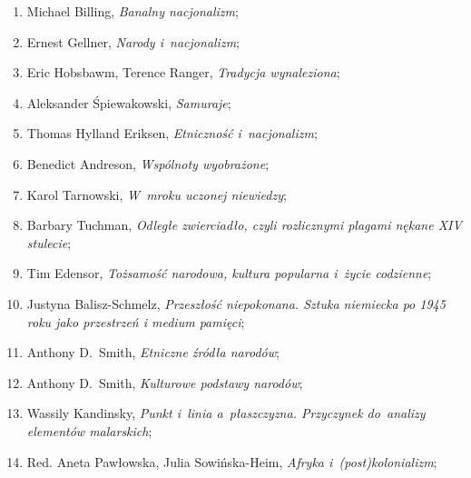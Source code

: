 \documentclass[a4paper,11pt]{article}
\begin{document}
\begin{enumerate}
\item Michael Billing, \textit{Banalny nacjonalizm};



\item Ernest Gellner, \textit{Narody i~nacjonalizm};



\item Eric Hobsbawm, Terence Ranger, \textit{Tradycja wynaleziona};



\item Aleksander Śpiewakowski, \textit{Samuraje};



\item Thomas Hylland Eriksen, \textit{Etniczność i~nacjonalizm};



\item Benedict Andreson, \textit{Wspólnoty wyobrażone};



\item Karol Tarnowski, \textit{W~mroku uczonej niewiedzy};



\item Barbary Tuchman, \textit{Odległe zwierciadło, czyli rozlicznymi
    plagami nękane XIV stulecie};



\item Tim Edensor, \textit{Tożsamość narodowa, kultura popularna i~życie
    codzienne};



\item Justyna Balisz-Schmelz, \textit{Przeszłość niepokonana. Sztuka
    niemiecka po 1945 roku jako przestrzeń i medium pamięci};



\item Anthony D.~Smith, \textit{Etniczne źródła narodów};



\item Anthony D.~Smith, \textit{Kulturowe podstawy narodów};



\item Wassily Kandinsky, \textit{Punkt i~linia a~płaszczyzna. Przyczynek
    do~analizy elementów malarskich};



\item Red. Aneta Pawłowska, Julia Sowińska-Heim, \textit{Afryka
    i~(post)kolonializm};




\end{enumerate}
\end{document}
